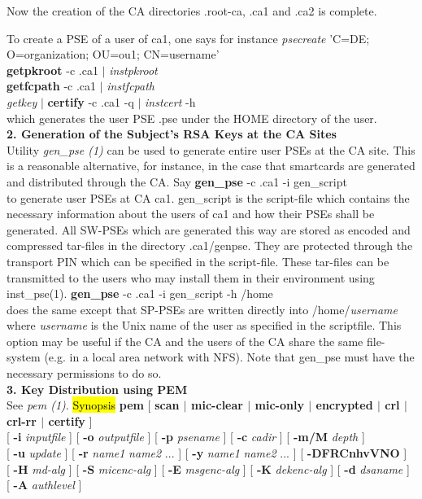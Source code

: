 Now the creation of the CA directories .root-ca, .ca1 and .ca2 is complete.
 
To create a PSE of a user of ca1, one says for instance
\bvtab
\1 {\em psecreate} 'C=DE; O=organization; OU=ou1; CN=username' \\
\1 {\bf getpkroot} -c .ca1 $|$ {\em instpkroot} \\
\1 {\bf getfcpath} -c .ca1 $|$ {\em instfcpath} \\
\1 {\em getkey} $|$ {\bf certify} -c .ca1 -q $|$ {\em instcert} -h \\
\evtab
which generates the user PSE .pse under the HOME directory of the user.
\\ [1em]
{\bf 2. Generation of the Subject's RSA Keys at the CA Sites}
\\ [1em]
Utility {\em gen\_pse (1)} can be used to generate entire user PSEs at the CA
site. This is a reasonable alternative, for instance, in the case that smartcards
are generated and distributed through the CA. Say
\bvtab
\1 {\bf gen\_pse} -c .ca1 -i gen\_script  \\
\evtab
to generate user PSEs at CA ca1. gen\_script is the script-file which contains
the necessary information about the users of ca1 and how their PSEs shall be generated.
All SW-PSEs which are generated this way are stored as encoded and compressed tar-files
in the directory .ca1/genpse. They are protected through the transport PIN which can
be specified in the script-file. These tar-files can be transmitted to the users
who may install them in their environment using inst\_pse(1).
\bvtab
\1 {\bf gen\_pse} -c .ca1 -i gen\_script -h /home \\
\evtab
does the same except that SP-PSEs are written directly into /home/{\em username}
where {\em username} is the Unix name of the user as specified in the scriptfile.
This option may be useful if the CA and the users of the CA share the same
file-system (e.g. in a local area network with NFS). Note that gen\_pse
must have the necessary permissions to do so.
\\ [1em]
{\bf 3. Key Distribution using PEM}
\\ [1em]
See {\em pem (1)}.
\label{pem}
\hl{Synopsis}
{\bf pem} [ {\bf scan $|$ mic-clear $|$ mic-only $|$ encrypted $|$ crl $|$ crl-rr $|$ certify } ]
\\ \hspace*{0.95cm} 
[ {\bf -i} {\em inputfile} ] [ {\bf -o} {\em outputfile} ] [ {\bf -p} {\em psename} ] [ {\bf -c} {\em cadir} ] [ {\bf 
-m/M}  {\em depth} ] 
\\ \hspace*{0.95cm}
[ {\bf -u} {\em update} ] [ {\bf -r} {\em name1} {\em name2} ... ] [ {\bf -y} {\em name1} {\em name2} ... ] [ {\bf 
-DFRCnhvVNO} ]
\\ \hspace*{0.95cm}
[ {\bf -H} {\em md-alg} ] [ {\bf -S} {\em micenc-alg} ] [ {\bf -E} {\em msgenc-alg} ] [ 
{\bf -K} {\em dekenc-alg} ] [ {\bf -d} {\em dsaname} ]
\\ \hspace*{0.95cm} [ {\bf -A} {\em authlevel} ]

